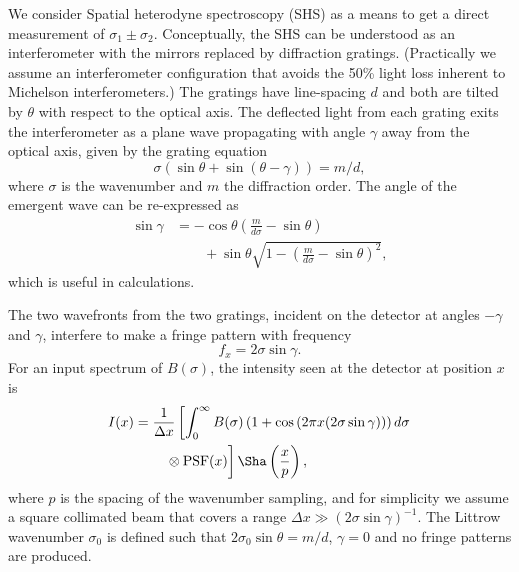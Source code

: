 \documentclass[preprint2, 10pt]{aastex}
\begin{document}
We consider Spatial heterodyne spectroscopy (SHS) \citep{1990SPIE.1235..622H}
as a means to get a direct measurement of  $\sigma_1\pm\sigma_2$.
Conceptually, the SHS can be understood as an interferometer with the  mirrors replaced by diffraction gratings.
(Practically we assume an interferometer configuration that  avoids the 50\% light loss inherent to  Michelson interferometers.)
The gratings have line-spacing $d$ and both are tilted
by $\theta$ with respect to the optical axis.  The deflected light from each grating exits the interferometer as a plane wave
propagating with angle $\gamma$ away from the optical axis,  given by the grating equation
\begin{equation}
\sigma\left(\sin{\theta}+\sin{\left(\theta-\gamma\right)}\right)=m/d,
\end{equation}
where $\sigma$ is the wavenumber and $m$ the diffraction order.
The angle of the emergent wave can be re-expressed as
\begin{align}
\sin{\gamma} & =-\cos{\theta} \left(\frac{m}{d\sigma} - \sin{\theta} \right) \nonumber \\
& \qquad + \sin{\theta}\sqrt{1-\left(\frac{m}{d\sigma} -\sin{\theta} \right)^2},
\end{align}
which is useful in calculations.

The two wavefronts from the two gratings, incident on the detector at angles $-\gamma$ and $\gamma$, interfere to make a fringe
pattern with  frequency
\begin{equation}
f_x=2\sigma\sin{\gamma}.
\end{equation}
For an input spectrum of $B(\sigma)$, the intensity seen at the detector at position $x$ is
\begin{align}
I(x)& =\frac{1}{\Delta x}\left[\int_{0}^{\infty} B(\sigma)\left(1+\cos{\left(2 \pi x (2\sigma \sin{\gamma})\right)}\right)d\sigma \right. \nonumber \\
& \qquad \left.\vphantom{\int_{0}^{\infty}} \otimes \mbox{PSF}(x)\right]\Sha\left(\frac{x}{p}\right),
\end{align}
where  $p$ is the spacing of the wavenumber sampling, and for simplicity we assume a square collimated beam that covers
a range  $\Delta x \gg \left(2\sigma \sin{\gamma}\right)^{-1}$.
The Littrow wavenumber $\sigma_0$ is defined such that $2\sigma_0\sin{\theta}=m/d$, $\gamma=0$ and no fringe patterns are produced.

\end{document}

